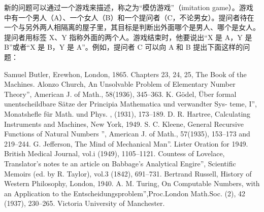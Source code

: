 \documentclass[12pt,a4paper,twoside]{article}
\begin{document}
新的问题可以通过一个游戏来描述，称之为“模仿游戏”（imitation game）。游戏中有一个男人（A）、一个女人（B）和一个提问者（C，不论男女）。提问者待在一个与另外两人相隔离的屋子里，其目标是判断出外面哪个是男人、哪个是女人。提问者用标签 X、Y 指称外面的两个人。游戏结束时，他要说出“X 是 A，Y 是 B”或者“X 是 B，Y 是 A”。例如，提问者 C 可以向 A 和 B 提出下面这样的问题：





\begin{thebibliography}{99}
 Samuel Butler, Erewhon, London, 1865. Chapters 23, 24, 25, The Book of the Machines.
 Alonzo Church, An Unsolvable Problem of Elementary Number Theory”, American J. of Math., 58(1936), 345–363.
 K. Gödel, Über formal unentscheildbare Sätze der Principia Mathematica und verwandter Sys- teme, I”, Monatshefle für Math. und Phys. , (1931), 173–189.
 D. R. Hartree, Calculating Instruments and Machines, New York, 1949.
 S. C. Kleene, General Recursive Functions of Natural Numbers ”, American J. of Math., 57(1935), 153–173 and 219–244.
 G. Jefferson, The Mind of Mechanical Man”. Lister Oration for 1949. British Medical Journal, vol.i (1949), 1105–1121.
 Countess of Lovelace, Translator’s notes te an article on Babbage’s Analytical Engire”, Scientific Memoirs (ed. by R. Taylor), vol.3 (1842), 691–731.
 Bertrand Russell, History of Western Philosophy, London, 1940.
 A. M. Turing, On Computable Numbers, with an Application to the Entscheidungsproblem”,Proc.London Math.Soc. (2), 42 (1937), 230–265. Victoria University of Manchester.

\end{thebibliography}
\end{document}

